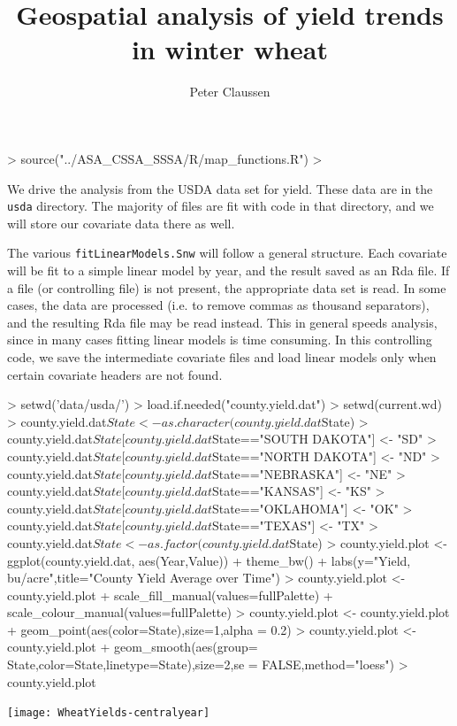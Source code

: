 \documentclass{report}
\begin{document}
\title{Geospatial analysis of yield trends in winter wheat}\author{Peter Claussen}\maketitle


\begin{Schunk}
\begin{Sinput}
> source("../ASA_CSSA_SSSA/R/map_functions.R")
> 
\end{Sinput}
\end{Schunk}

We drive the analysis from the USDA data set for yield. These data are in the \verb|usda| directory.
The majority of files are fit with code in that directory, and we will store our covariate data there as well.

The various \verb|fitLinearModels.Snw| will follow a general structure. Each covariate will be fit to a simple linear model by year, and the result saved
as an Rda file. If a file (or controlling file) is not present, the appropriate data set is read. In some cases, the data are processed (i.e. to remove commas as thousand separators), and the resulting Rda file may be read instead. This in general speeds analysis, since in many cases fitting linear models is time consuming. In this controlling code, we save the intermediate covariate files and load linear models only when certain covariate headers are not found.


\begin{Schunk}
\begin{Sinput}
> setwd('data/usda/')
> load.if.needed("county.yield.dat")
> setwd(current.wd)
> county.yield.dat$State <- as.character(county.yield.dat$State)
> county.yield.dat$State[county.yield.dat$State=="SOUTH DAKOTA"] <- "SD"
> county.yield.dat$State[county.yield.dat$State=="NORTH DAKOTA"] <- "ND"
> county.yield.dat$State[county.yield.dat$State=="NEBRASKA"] <- "NE"
> county.yield.dat$State[county.yield.dat$State=="KANSAS"] <- "KS"
> county.yield.dat$State[county.yield.dat$State=="OKLAHOMA"] <- "OK"
> county.yield.dat$State[county.yield.dat$State=="TEXAS"] <- "TX"
> county.yield.dat$State <- as.factor(county.yield.dat$State)
> county.yield.plot <- ggplot(county.yield.dat, aes(Year,Value)) + theme_bw() + labs(y="Yield, bu/acre",title="County Yield Average over Time")
> county.yield.plot <- county.yield.plot + scale_fill_manual(values=fullPalette) + scale_colour_manual(values=fullPalette)
> county.yield.plot <- county.yield.plot + geom_point(aes(color=State),size=1,alpha = 0.2)
> county.yield.plot <- county.yield.plot + geom_smooth(aes(group= State,color=State,linetype=State),size=2,se = FALSE,method="loess")
> county.yield.plot
\end{Sinput}
\end{Schunk}
\texttt{[image: WheatYields-centralyear]}
\end{document}
